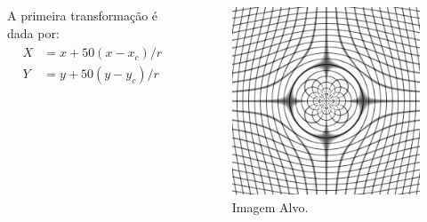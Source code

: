 \documentclass[t]{beamer}
\begin{document}
\begin{frame}
   \begin{columns}[c]
        A primeira transformação é dada por:
        \begin{align}
        \begin{split}
            X &= x + 50(x-x_c)/r \\
            Y &= y + 50(y-y_c)/r 
        \end{split} 
        \end{align}
        \begin{figure}[!h]
          \begin{center}
            \includegraphics[width=1.0\textwidth]{../images/gridDist.png}
            \caption{Imagem Alvo.}
          \end{center}
        \end{figure}
    \end{columns}
\end{frame}
\end{document}
